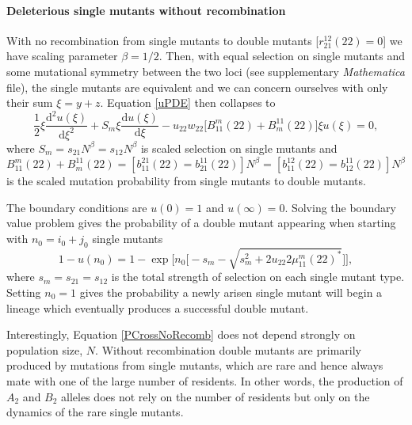 \documentclass[review,3p,authoryear]{elsarticle}
\begin{document}
\paragraph{Deleterious single mutants without recombination}

With no recombination from single mutants to double mutants [$r_{21}^{12}(22) = 0$] we have scaling parameter $\beta=1/2$.
Then, with equal selection on single mutants and some mutational symmetry between the two loci (see supplementary \textit{Mathematica} file), the single mutants are equivalent and we can concern ourselves with only their sum $\xi = y + z$. 
Equation \eqref{uPDE} then collapses to
\begin{equation}\label{NoRecombDEu}
\frac{1}{2} \xi \frac{\mathrm{d}^2 u(\xi)}{\mathrm{d} \xi^2} + S_m \xi \frac{\mathrm{d} u(\xi)}{\mathrm{d} \xi} - u_{22} w_{22} \Big[ B_{11}^{m}(22) + B_{m}^{11}(22) \Big] \xi u(\xi) = 0,
\end{equation}
where $S_m=s_{21}N^\beta=s_{12}N^\beta$ is scaled selection on single mutants and $B_{11}^{m}(22)+B_{m}^{11}(22)=[b_{11}^{21}(22)=b_{21}^{11}(22)]N^\beta=[b_{11}^{12}(22)=b_{12}^{11}(22)]N^\beta$ is the scaled mutation probability from single mutants to double mutants.

The boundary conditions are $u(0)=1$ and $u(\infty)=0$.
Solving the boundary value problem gives the probability of a double mutant appearing when starting with $n_0 = i_0 + j_0$ single mutants
\begin{equation}\label{PCrossNoRecomb}
1 - u(n_0) = 1 - \exp \Big[ n_0 \big[ -s_m - \sqrt{ s_m^2 + 2u_{22} 2\mu_{11}^{m}(22)^*} \big] \Big],
\end{equation}
where $s_m = s_{21}=s_{12}$ is the total strength of selection on each single mutant type.
Setting $n_0=1$ gives the probability a newly arisen single mutant will begin a lineage which eventually produces a successful double mutant.


Interestingly, Equation \eqref{PCrossNoRecomb} does not depend strongly on population size, $N$.
Without recombination double mutants are primarily produced by mutations from single mutants, which are rare and hence always mate with one of the large number of residents.
In other words, the production of $A_2$ and $B_2$ alleles does not rely on the number of residents but only on the dynamics of the rare single mutants.

\end{document}
